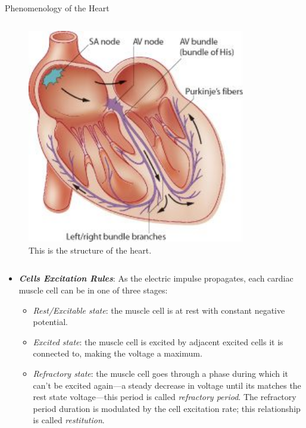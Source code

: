 \documentclass[final,hyperref={pdfpagelabels=false}]{beamer}
\begin{document}
\begin{frame}[t]
\begin{columns}[t]
\begin{column}{.465\textwidth}
\begin{block}{Phenomenology of the Heart}
\begin{columns}
\begin{column}{.43\textwidth}
	\begin{figure}
	
	
	\includegraphics[width=0.85\textwidth]{heart}
	\caption{\label{fig:heart}This is the structure of the heart.}
	\end{figure}
\end{column}
\end{columns}
\begin{itemize}

	\item \textbf{ \textit{Cells Excitation Rules}}: As the electric impulse propagates, each cardiac muscle cell can be in one of three stages:

		\begin{itemize}
 		 \item \textit{Rest/Excitable state}: the muscle cell is at rest with constant negative potential.								
  		\item \textit{Excited state}: the muscle cell is excited by adjacent excited cells it is connected to, making the voltage a maximum. 
  		\item \textit{Refractory state}: the muscle cell goes through a phase during which it can't be excited again---a steady decrease in voltage until its matches the rest state voltage---this period is called \textit{refractory period}. The refractory period duration is modulated by the cell excitation rate; this relationship is called \textit{restitution}.
		\end{itemize}  


\end{itemize}
\end{block}
\end{column}
\end{columns}
\end{frame}
\end{document}
